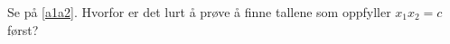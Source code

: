 






\opgt	
	
Se på \eqref{a1a2}. Hvorfor er det lurt å prøve å finne tallene som oppfyller $ x_1x_2 =c $ først?
